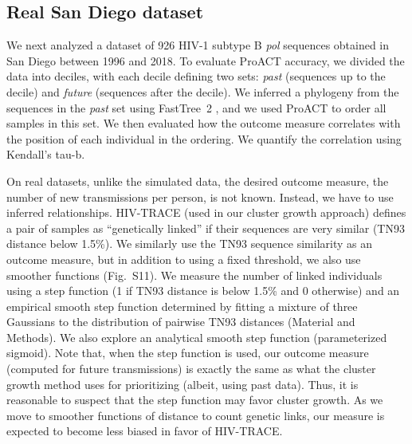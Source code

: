 \documentclass[oupdraft]{sysbio}
\newcommand{\PLWH}{sample\xspace}
\begin{document}
\subsection{Real San Diego dataset}
We next analyzed a dataset of 926 HIV-1 subtype B \textit{pol} sequences obtained in San Diego between 1996 and 2018.
To evaluate ProACT accuracy,
we divided the data into deciles, with each decile defining two sets: \textit{past} (sequences up to the decile) and \textit{future} (sequences after the decile). We inferred a phylogeny from the sequences  in the \textit{past} set using FastTree~2 \citep{Price2010}, %
and we used ProACT to order all \PLWH{s} in this set. 
We then evaluated how the  outcome measure correlates with the position of each individual in the ordering. 
We quantify the correlation using Kendall's tau-b.

On real datasets, unlike the simulated data, the desired outcome measure, the number of new transmissions per person, is not known. 
Instead, we have to use inferred relationships.
HIV-TRACE (used in our cluster growth approach) defines
a pair of \PLWH{s} as ``genetically linked''
if their sequences are very similar (TN93 distance below 1.5\%).
We similarly use the TN93 sequence similarity as an outcome measure, but in addition to using a fixed threshold, we also use smoother functions (Fig.~S11).
We measure the number of linked individuals using a step function (1 if TN93 distance is below 1.5\% and 0 otherwise) 
and an empirical smooth step function determined by fitting a mixture of three Gaussians to the distribution of pairwise TN93 distances (Material and Methods).
We also explore an analytical smooth step function (parameterized sigmoid).  
Note that, when the step function is used, our outcome measure (computed for future transmissions) is exactly the same as what the cluster growth method uses for prioritizing (albeit, using past data). 
Thus, it is reasonable to suspect that the step function may favor cluster growth. 
As we move to smoother functions of distance to count genetic links, our measure is expected to become less biased in favor of HIV-TRACE. 
\end{document}
